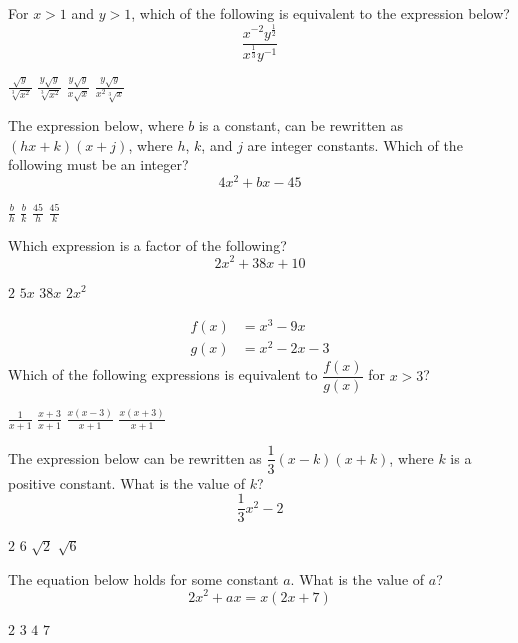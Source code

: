 \newpage

\question[1]
For $x>1$ and $y>1$, which of the following is equivalent to the expression below?
\[
  \frac{x^{-2} y^{\frac{1}{2}}}{x^{\frac{1}{3}} y^{-1}}
\]
\begin{choices}
  \choice $\displaystyle\frac{\sqrt{y}}{\sqrt[3]{x^{2}}}$
  \choice $\displaystyle\frac{y \sqrt{y}}{\sqrt[3]{x^{2}}}$
  \choice $\displaystyle\frac{y \sqrt{y}}{x \sqrt{x}}$
  \CorrectChoice $\displaystyle\frac{y \sqrt{y}}{x^{2} \sqrt[3]{x}}$
\end{choices}

\question[1]
The expression below, where $b$ is a constant, can be rewritten as $(h x+k)(x+j)$, where $h$, $k$, and $j$ are integer constants. Which of the following must be an integer?
\[
  4 x^{2}+b x-45
\]
\begin{choices}
  \choice $\displaystyle\frac{b}{h}$
  \choice $\displaystyle\frac{b}{k}$
  \choice $\displaystyle\frac{45}{h}$
  \CorrectChoice $\displaystyle\frac{45}{k}$
\end{choices}

\question[1]
Which expression is a factor of the following?
\[
  2 x^{2}+38 x+10
\]
\begin{choices}
  \CorrectChoice $2$
  \choice $5 x$
  \choice $38 x$
  \choice $2 x^{2}$
\end{choices}

\newpage

\question[1]
\[
  \begin{aligned}
    f(x)&=x^{3}-9 x \\
    g(x)&=x^{2}-2 x-3
  \end{aligned}
\]
Which of the following expressions is equivalent to $\dfrac{f(x)}{g(x)}$ for $x>3$?
\begin{choices}
  \choice $\displaystyle\frac{1}{x+1}$
  \choice $\displaystyle\frac{x+3}{x+1}$
  \choice $\displaystyle\frac{x(x-3)}{x+1}$
  \CorrectChoice $\displaystyle\frac{x(x+3)}{x+1}$
\end{choices}

\question[1]
The expression below can be rewritten as $\dfrac{1}{3}(x-k)(x+k)$, where $k$ is a positive constant. What is the value of $k$?
\[
  \frac{1}{3} x^{2}-2
\]
\begin{choices}
  \choice $2$
  \choice $6$
  \choice $\sqrt{2}$
  \CorrectChoice $\sqrt{6}$
\end{choices}

\question[1]
The equation below holds for some constant $a$. What is the value of $a$?
\[
  2 x^{2}+a x = x(2 x+7)
\]
\begin{choices}
  \choice $2$
  \choice $3$
  \choice $4$
  \CorrectChoice $7$
\end{choices}


